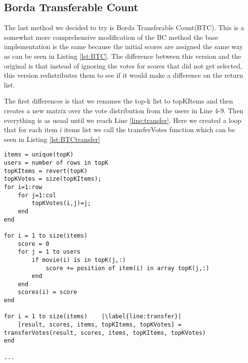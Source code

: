 \subsection{Borda Transferable Count} \label{sec:BTC}
The last method we decided to try is Borda Transferable Count(BTC). This is a somewhat more comprehensive modification of the BC method the base implementation is the same because the initial scores are assigned the same way as can be seen in Listing \ref{lst:BTC}. The difference between this version and the original is that instead of ignoring the votes for scores that did not get selected, this version redistributes them to see if it would make a difference on the return list.

The first differences is that we renames the top-k list to topKItems and then creates a new matrix over the vote distribution from the users in Line 4-9. Then everything is as usual until we reach Line \ref{line:transfer}. Here we created a loop that for each item i items list we call the transferVotes function which can be seen in Listing \ref{lst:BTCtransfer}


\begin{lstlisting}[caption={Borda transferable count implementation},label=lst:BTC]
items = unique(topK)
users = number of rows in topK
topKItems = revert(topK)
topKVotes = size(topKItems);
for i=1:row
    for j=1:col
        topKVotes(i,j)=j;
    end 
end

for i = 1 to size(items)
	score = 0
	for j = 1 to users
		if movie(i) is in topK(j,:)
			score += position of item(i) in array topK(j,:)
		end
	end
	scores(i) = score
end

for i = 1 to size(items)	|\label{line:transfer}|
	[result, scores, items, topKItems, topKVotes] = transferVotes(result, scores, items, topKItems, topKVotes)
end
	
...
\end{lstlisting}

